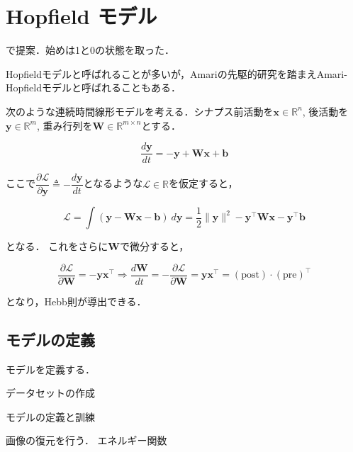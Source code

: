 \section{Hopfield モデル}


\cite{Hopfield1982-vu}で提案．始めは1と0の状態を取った．

Hopfieldモデルと呼ばれることが多いが，Amariの先駆的研究\cite{Amari1972-fq}を踏まえAmari-Hopfieldモデルと呼ばれることもある．

次のような連続時間線形モデルを考える．シナプス前活動を$\mathbf{x}\in \mathbb{R}^n$, 後活動を$\mathbf{y}\in \mathbb{R}^m$, 重み行列を$\mathbf{W}\in \mathbb{R}^{m\times n}$とする．


\begin{equation}
\frac{d\mathbf{y}}{dt}=-\mathbf{y}+\mathbf{W}\mathbf{x}+\mathbf{b}
\end{equation}


ここで$\dfrac{\partial\mathcal{L}}{\partial\mathbf{y}}\triangleq-\dfrac{d\mathbf{y}}{dt}$となるような$\mathcal{L}\in \mathbb{R}$を仮定すると，


\begin{equation}
\mathcal{L}=\int \left(\mathbf{y}-\mathbf{W}\mathbf{x}-\mathbf{b}\right)\ d\mathbf{y}=\frac{1}{2}\|\mathbf{y}\|^2-\mathbf{y}^\top \mathbf{W}\mathbf{x}-\mathbf{y}^\top \mathbf{b}
\end{equation}


となる． これをさらに$\mathbf{W}$で微分すると，


\begin{equation}
\dfrac{\partial\mathcal{L}}{\partial\mathbf{W}}=-\mathbf{y}\mathbf{x}^\top\Rightarrow
\frac{d\mathbf{W}}{dt}=-\dfrac{\partial\mathcal{L}}{\partial\mathbf{W}}=\mathbf{y}\mathbf{x}^\top=(\text{post})\cdot (\text{pre})^\top
\end{equation}


となり，Hebb則が導出できる．
\subsection{モデルの定義}
モデルを定義する．



データセットの作成



モデルの定義と訓練



画像の復元を行う．
エネルギー関数


